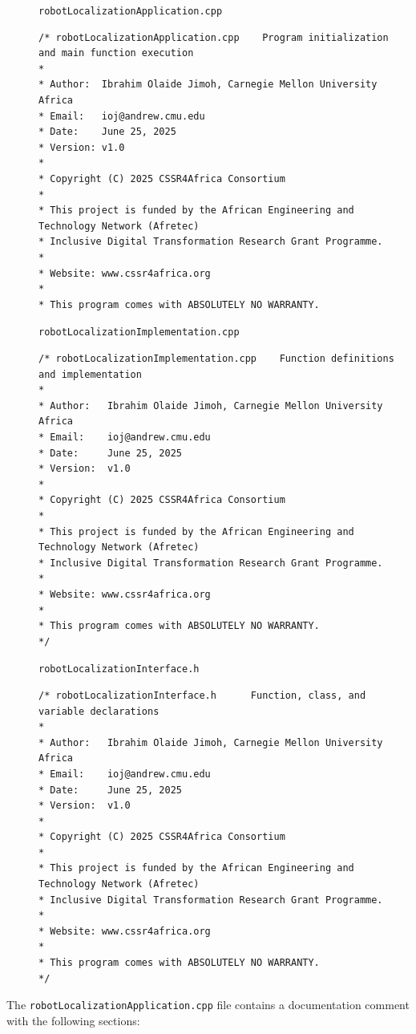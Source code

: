 \documentclass{CSSRforAfrica}
\newcommand{\checkboxChecked}{\fbox{\ding{51}}} %
\begin{document}
\begin{description}

\item[\checkboxChecked] {\small \verb+robotLocalizationApplication.cpp+}
{\scriptsize \begin{verbatim}
/* robotLocalizationApplication.cpp    Program initialization and main function execution
*
* Author:  Ibrahim Olaide Jimoh, Carnegie Mellon University Africa
* Email:   ioj@andrew.cmu.edu
* Date:    June 25, 2025
* Version: v1.0
*
* Copyright (C) 2025 CSSR4Africa Consortium
*
* This project is funded by the African Engineering and Technology Network (Afretec)
* Inclusive Digital Transformation Research Grant Programme.
*
* Website: www.cssr4africa.org
*
* This program comes with ABSOLUTELY NO WARRANTY.
\end{verbatim} }

\item[\checkboxChecked]  {\small \verb+robotLocalizationImplementation.cpp+}
{\scriptsize \begin{verbatim}
/* robotLocalizationImplementation.cpp    Function definitions and implementation
*
* Author:   Ibrahim Olaide Jimoh, Carnegie Mellon University Africa
* Email:    ioj@andrew.cmu.edu
* Date:     June 25, 2025
* Version:  v1.0
*
* Copyright (C) 2025 CSSR4Africa Consortium
*
* This project is funded by the African Engineering and Technology Network (Afretec)
* Inclusive Digital Transformation Research Grant Programme.
*
* Website: www.cssr4africa.org
*
* This program comes with ABSOLUTELY NO WARRANTY.
*/
\end{verbatim} }

\item[\checkboxChecked] {\small \verb+robotLocalizationInterface.h+}
{\scriptsize \begin{verbatim}
/* robotLocalizationInterface.h      Function, class, and variable declarations
*
* Author:   Ibrahim Olaide Jimoh, Carnegie Mellon University Africa
* Email:    ioj@andrew.cmu.edu
* Date:     June 25, 2025
* Version:  v1.0
*
* Copyright (C) 2025 CSSR4Africa Consortium
*
* This project is funded by the African Engineering and Technology Network (Afretec)
* Inclusive Digital Transformation Research Grant Programme.
*
* Website: www.cssr4africa.org
*
* This program comes with ABSOLUTELY NO WARRANTY.
*/
\end{verbatim} }

\end{description}

\noindent The {\small \verb+robotLocalizationApplication.cpp+} file contains a documentation comment with the following sections:
\end{document}
